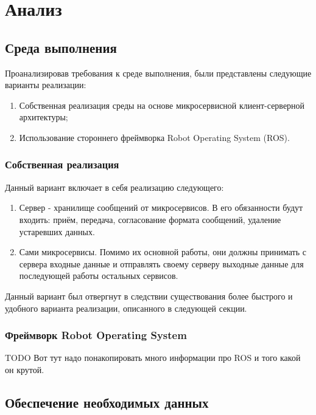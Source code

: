 \chapter{Анализ}\label{ch:ch2}

\section{Среда выполнения}\label{sec:ch2/sec1}

Проанализировав требования к среде выполнения, были представлены следующие варианты реализации:
\begin{enumerate}[beginpenalty=10000] %
  \item Собственная реализация среды на основе микросервисной клиент-серверной архитектуры;
  \item Использование стороннего фреймворка Robot Operating System (ROS).
\end{enumerate}

\subsection{Собственная реализация}
Данный вариант включает в себя реализацию следующего: 
\begin{enumerate}[beginpenalty=10000] %
  \item Сервер - хранилище сообщений от микросервисов. В его обязанности будут входить: приём, передача, согласование формата сообщений, удаление устаревших данных.
  \item Сами микросервисы. Помимо их основной работы, они должны принимать с сервера входные данные и отправлять своему серверу выходные данные для последующей работы остальных сервисов.
\end{enumerate}

Данный вариант был отвергнут в следствии существования более быстрого и удобного варианта реализации, описанного в следующей секции.

\subsection{Фреймворк Robot Operating System}
TODO Вот тут надо понакопировать много информации про ROS и того какой он крутой. 

\section{Обеспечение необходимых данных}
